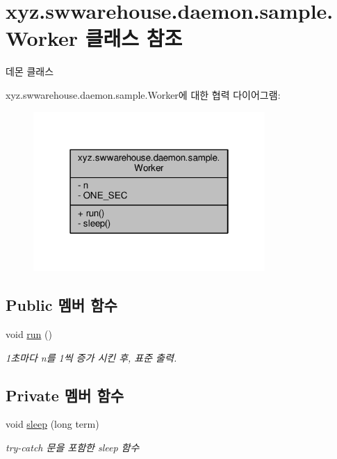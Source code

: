 \hypertarget{classxyz_1_1swwarehouse_1_1daemon_1_1sample_1_1_worker}{\section{xyz.\-swwarehouse.\-daemon.\-sample.\-Worker 클래스 참조}
\label{classxyz_1_1swwarehouse_1_1daemon_1_1sample_1_1_worker}
}


데몬 클래스  




xyz.\-swwarehouse.\-daemon.\-sample.\-Worker에 대한 협력 다이어그램\-:
\nopagebreak
\begin{figure}[H]
\begin{center}
\leavevmode
\includegraphics[width=250pt]{classxyz_1_1swwarehouse_1_1daemon_1_1sample_1_1_worker__coll__graph}
\end{center}
\end{figure}
\subsection*{Public 멤버 함수}
\begin{DoxyCompactItemize}
\item 
void \hyperlink{classxyz_1_1swwarehouse_1_1daemon_1_1sample_1_1_worker_af1bf199e3277a2946e59c7acc5416731}{run} ()
\begin{DoxyCompactList}\small\item\em 1초마다 n를 1씩 증가 시킨 후, 표준 출력. \end{DoxyCompactList}\end{DoxyCompactItemize}
\subsection*{Private 멤버 함수}
\begin{DoxyCompactItemize}
\item 
void \hyperlink{classxyz_1_1swwarehouse_1_1daemon_1_1sample_1_1_worker_ae9991783aa9ada529a18ecb5abdb4ad7}{sleep} (long term)
\begin{DoxyCompactList}\small\item\em try-\/catch 문을 포함한 sleep 함수 \end{DoxyCompactList}\end{DoxyCompactItemize}
